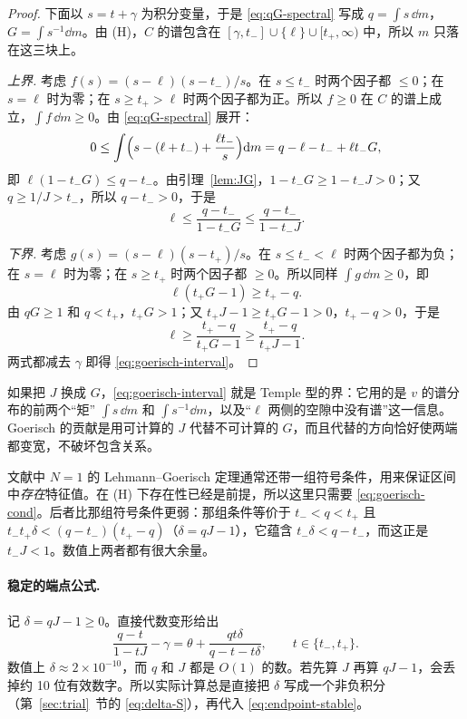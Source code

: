 \documentclass[11pt,a4paper,fontset=fandol]{ctexart}
\begin{document}
\begin{proof}
下面以 $s=t+\gamma$ 为积分变量，于是 \eqref{eq:qG-spectral} 写成 $q=\int s\,\dd m$，$G=\int s^{-1}\dd m$。由 (H)，$C$ 的谱包含在 $[\gamma,t_-]\cup\{\ell\}\cup[t_+,\infty)$ 中，所以 $m$ 只落在这三块上。

\emph{上界.} 考虑 $f(s)=(s-\ell)(s-t_-)/s$。在 $s\le t_-$ 时两个因子都 $\le0$；在 $s=\ell$ 时为零；在 $s\ge t_+>\ell$ 时两个因子都为正。所以 $f\ge0$ 在 $C$ 的谱上成立，$\int f\,\dd m\ge0$。由 \eqref{eq:qG-spectral} 展开：
\[
0\le\int\Bigl(s-(\ell+t_-)+\frac{\ell t_-}{s}\Bigr)\mathrm{d} m=q-\ell-t_-+\ell t_-G ,
\]
即 $\ell(1-t_-G)\le q-t_-$。由引理~\ref{lem:JG}，$1-t_-G\ge1-t_-J>0$；又 $q\ge1/J>t_-$，所以 $q-t_->0$，于是
\[
\ell\le\frac{q-t_-}{1-t_-G}\le\frac{q-t_-}{1-t_-J}.
\]

\emph{下界.} 考虑 $g(s)=(s-\ell)(s-t_+)/s$。在 $s\le t_-<\ell$ 时两个因子都为负；在 $s=\ell$ 时为零；在 $s\ge t_+$ 时两个因子都 $\ge0$。所以同样 $\int g\,\dd m\ge0$，即
\[
\ell(t_+G-1)\ge t_+-q .
\]
由 $qG\ge1$ 和 $q<t_+$，$t_+G>1$；又 $t_+J-1\ge t_+G-1>0$，$t_+-q>0$，于是
\[
\ell\ge\frac{t_+-q}{t_+G-1}\ge\frac{t_+-q}{t_+J-1}.
\]
两式都减去 $\gamma$ 即得 \eqref{eq:goerisch-interval}。
\end{proof}

\begin{remark}[这个证明在做什么]
如果把 $J$ 换成 $G$，\eqref{eq:goerisch-interval} 就是 Temple 型的界：它用的是 $v$ 的谱分布的前两个“矩” $\int s\,\dd m$ 和 $\int s^{-1}\dd m$，以及“$\ell$ 两侧的空隙中没有谱”这一信息。Goerisch 的贡献是用可计算的 $J$ 代替不可计算的 $G$，而且代替的方向恰好使两端都变宽，不破坏包含关系。

文献中 $N=1$ 的 Lehmann--Goerisch 定理通常还带一组符号条件，用来保证区间中\emph{存在}特征值。在 (H) 下存在性已经是前提，所以这里只需要 \eqref{eq:goerisch-cond}。后者比那组符号条件更弱：那组条件等价于 $t_-<q<t_+$ 且 $t_-t_+\delta<(q-t_-)(t_+-q)$（$\delta=qJ-1$），它蕴含 $t_-\delta<q-t_-$，而这正是 $t_-J<1$。数值上两者都有很大余量。
\end{remark}

\paragraph{稳定的端点公式.} 记 $\delta=qJ-1\ge0$。直接代数变形给出
\begin{equation}
\label{eq:endpoint-stable}
\frac{q-t}{1-tJ}-\gamma=\theta+\frac{qt\delta}{q-t-t\delta},\qquad t\in\{t_-,t_+\}.
\end{equation}
数值上 $\delta\approx2\times10^{-10}$，而 $q$ 和 $J$ 都是 $O(1)$ 的数。若先算 $J$ 再算 $qJ-1$，会丢掉约 10 位有效数字。所以实际计算总是直接把 $\delta$ 写成一个非负积分（第~\ref{sec:trial}~节的 \eqref{eq:delta-S}），再代入 \eqref{eq:endpoint-stable}。
\end{document}
